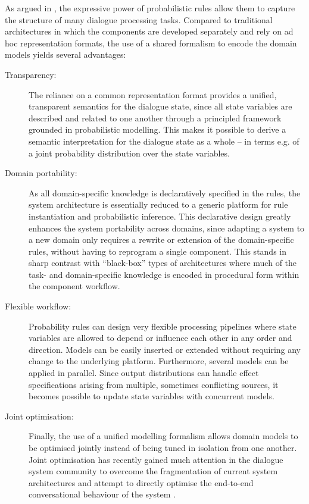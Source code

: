 As argued in \cite{lison-semdial2012}, the expressive power of probabilistic rules allow them to capture the structure of many dialogue processing tasks.  Compared to traditional architectures in which the components are developed separately and rely on ad hoc representation formats, the use of a shared formalism to encode the domain models yields several advantages:
\begin{description}
\item [Transparency: ] The reliance on a common representation format provides a unified, transparent semantics for the dialogue state, since all state variables are described and related to one another through a principled framework grounded in probabilistic modelling.  This makes it possible to derive a semantic interpretation for the dialogue state as a whole -- in terms e.g. of a joint probability distribution over the state variables. 

\item [Domain portability: ]  As all domain-specific knowledge is declaratively specified in the rules, the system architecture is essentially reduced to a generic platform for rule instantiation and probabilistic inference.  This declarative design greatly enhances the system portability across domains, since adapting a system to a new domain only requires a rewrite or extension of the domain-specific rules, without having to reprogram a single component.  This stands in sharp contrast with ``black-box'' types of architectures where much of the task- and domain-specific knowledge is encoded in procedural form within the component workflow.

\item [Flexible workflow: ] Probability rules can design very flexible processing pipelines where state variables are allowed to depend or influence each other in any order and direction.  Models can be easily inserted or extended without requiring any change to the underlying platform. Furthermore, several models can be applied in parallel. Since output distributions can handle effect specifications arising from multiple, sometimes conflicting sources, it becomes possible to update state variables with concurrent models. 

\item [Joint optimisation: ] Finally, the use of a unified modelling formalism allows domain models to be optimised jointly instead of being tuned in isolation from one another. Joint optimisation has recently gained much attention in the dialogue system community to overcome the fragmentation of current system architectures and attempt to directly optimise the end-to-end conversational behaviour of the system \citep{Lemon:2011}. 

\end{description}

